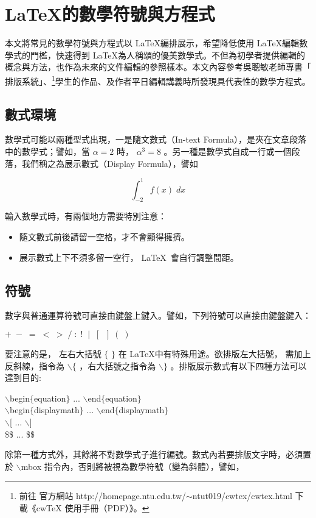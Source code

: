 %
\chapter{ \LaTeX{\MB 的數學符號與方程式}}
本文將常見的數學符號與方程式以 \LaTeX 編排展示，希望降低使用  \LaTeX 編輯數學式的門檻，快速得到  \LaTeX 為人稱頌的優美數學式。不但為初學者提供編輯的概念與方法，也作為未來的文件編輯的參照樣本。本文內容參考吳聰敏老師專書「\cw{} 排版系統」、\footnote{前往 \cw{} 官方網站 http://homepage.ntu.edu.tw/$\sim$ntut019/cwtex/cwtex.html 下載《cwTeX 使用手冊（PDF）》。}學生的作品、及作者平日編輯講義時所發現具代表性的數學方程式。

\section{數式環境}
數學式可能以兩種型式出現，一是隨文數式（In-text Formula），是夾在文章段落中的數學式；譬如，當 $\alpha=2$ 時， $\alpha^3=8$ 。另一種是數學式自成一行或一個段落，我們稱之為展示數式（Display Formula），譬如

$$\int_{-2}^{1} f(x)\;dx$$

輸入數學式時，有兩個地方需要特別注意：
\begin{itemize}
\item 隨文數式前後請留一空格，才不會顯得擁擠。
\item 展示數式上下不須多留一空行， \LaTeX\ 會自行調整間距。
\end{itemize}

\section{符號}
數字與普通運算符號可直接由鍵盤上鍵入。譬如，下列符號可以直接由鍵盤鍵入：

        \begin{center}
         $  + \;-\; =\; <\; > \;/ \;:\; !\;\; |\; \;[\;\; ] \;(\; )$\\
        \end{center}
要注意的是， 左右大括號 $\{$ $\}$ 在 \LaTeX 中有特殊用途。欲排版左大括號， 需加上反斜線，指令為 $\backslash\{$ ，右大括號之指令為 $\backslash\}$ 。排版展示數式有以下四種方法可以達到目的:
        \begin{center}
$\backslash$begin$\{$equation$\}$ ... $\backslash$end$\{$equation$\}$\\
$\backslash$begin$\{$displaymath$\}$ ... $\backslash$end$\{$displaymath$\}$\\
$\backslash$[ ... $\backslash$]\\
\$\$ ... \$\$
        \end{center}
除第一種方式外，其餘將不對數學式子進行編號。數式內若要排版文字時，必須置於 $\backslash$mbox 指令內，否則將被視為數學符號（變為斜體），譬如，

